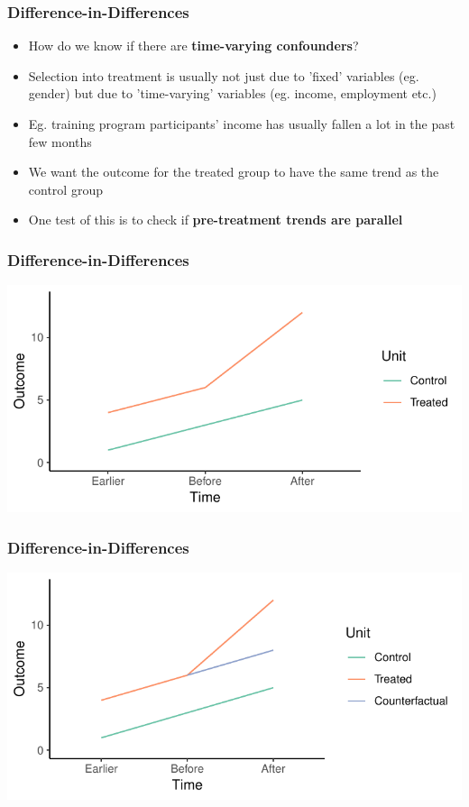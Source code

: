 \documentclass[xcolor=x11names,compress]{beamer}\usepackage[]{graphicx}\usepackage[]{color}
\makeatletter
\def\maxwidth{ %
  \ifdim\Gin@nat@width>\linewidth
    \linewidth
  \else
    \Gin@nat@width
  \fi
}
\newenvironment{knitrout}{}{} %
\renewcommand{\(}{\begin{columns}}
\renewcommand{\)}{\end{columns}}
\newcommand{\<}[1]{\begin{column}{#1}}
\renewcommand{\>}{\end{column}}
\makeatother
\begin{document}
\begin{frame}
\frametitle{Difference-in-Differences}
\begin{itemize}
\item How do we know if there are \textbf{time-varying confounders}?
\pause
\item Selection into treatment is usually not just due to 'fixed' variables (eg. gender) but due to 'time-varying' variables (eg. income, employment etc.)
\pause
\item Eg. training program participants' income has usually fallen a lot in the past few months
\pause
\item We want the outcome for the treated group to have the same trend as the control group
\pause
\item One test of this is to check if \textbf{pre-treatment trends are parallel}
\end{itemize}
\end{frame}

\begin{frame}
\frametitle{Difference-in-Differences}
\begin{knitrout}
\color{fgcolor}
\includegraphics[width=\maxwidth]{figure/DinD_chart6-1} 

\end{knitrout}
\end{frame}

\begin{frame}
\frametitle{Difference-in-Differences}
\begin{knitrout}
\color{fgcolor}
\includegraphics[width=\maxwidth]{figure/DinD_chart7-1} 

\end{knitrout}
\end{frame}
\end{document}
